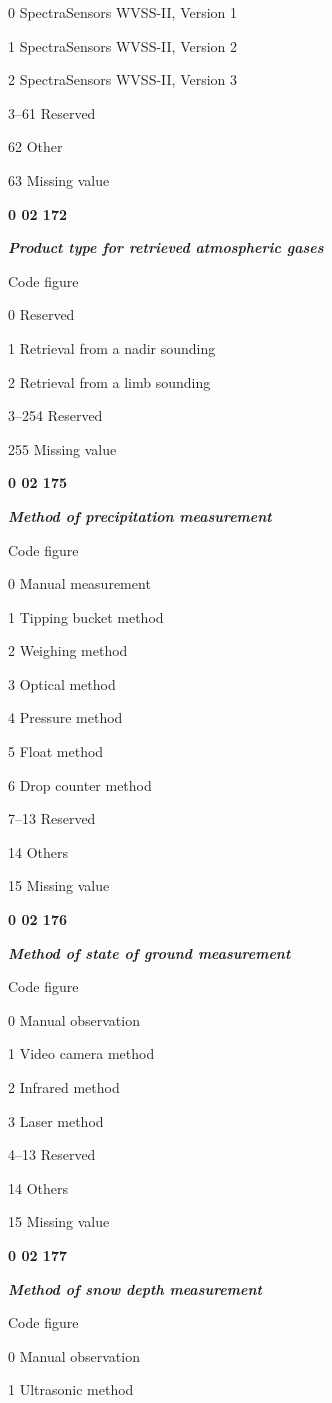 0 SpectraSensors WVSS-II, Version 1

1 SpectraSensors WVSS-II, Version 2

2 SpectraSensors WVSS-II, Version 3

3--61 Reserved

62 Other

63 Missing value

\textbf{0 02 172}

\emph{\textbf{Product type for retrieved atmospheric gases}}

Code figure

0 Reserved

1 Retrieval from a nadir sounding

2 Retrieval from a limb sounding

3--254 Reserved

255 Missing value

\textbf{0 02 175}

\emph{\textbf{Method of precipitation measurement}}

Code figure

0 Manual measurement

1 Tipping bucket method

2 Weighing method

3 Optical method

4 Pressure method

5 Float method

6 Drop counter method

7--13 Reserved

14 Others

15 Missing value

\textbf{0 02 176}

\emph{\textbf{Method of state of ground measurement}}

Code figure

0 Manual observation

1 Video camera method

2 Infrared method

3 Laser method

4--13 Reserved

14 Others

15 Missing value

\textbf{0 02 177}

\emph{\textbf{Method of snow depth measurement}}

Code figure

0 Manual observation

1 Ultrasonic method

